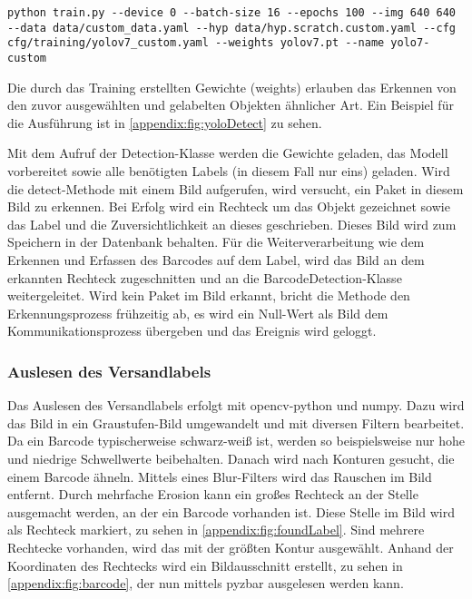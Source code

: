 \begin{lstlisting}[style=bash-style,
  caption={Befehl zum Trainieren des Modells},
  breaklines=true,
  label={lst:runYolov7}]
  python train.py --device 0 --batch-size 16 --epochs 100 --img 640 640 --data data/custom_data.yaml --hyp data/hyp.scratch.custom.yaml --cfg cfg/training/yolov7_custom.yaml --weights yolov7.pt --name yolo7-custom
\end{lstlisting}

Die durch das Training erstellten Gewichte (weights) erlauben das Erkennen von den zuvor ausgewählten und gelabelten Objekten ähnlicher Art. Ein Beispiel für die Ausführung ist in \vref{appendix:fig:yoloDetect} zu sehen.

Mit dem Aufruf der Detection-Klasse werden die Gewichte geladen, das Modell vorbereitet sowie alle benötigten Labels (in diesem Fall nur eins) geladen. Wird die detect-Methode mit einem Bild aufgerufen, wird versucht, ein Paket in diesem Bild zu erkennen. Bei Erfolg wird ein Rechteck um das Objekt gezeichnet sowie das Label und die Zuversichtlichkeit an dieses geschrieben. Dieses Bild wird zum Speichern in der Datenbank behalten. Für die Weiterverarbeitung wie dem Erkennen und Erfassen des Barcodes auf dem Label, wird das Bild an dem erkannten Rechteck zugeschnitten und an die BarcodeDetection-Klasse weitergeleitet. Wird kein Paket im Bild erkannt, bricht die Methode den Erkennungsprozess frühzeitig ab, es wird ein Null-Wert als Bild dem Kommunikationsprozess übergeben und das Ereignis wird geloggt.


\subsubsection{Auslesen des Versandlabels}

Das Auslesen des Versandlabels erfolgt mit opencv-python und numpy. Dazu wird das Bild in ein Graustufen-Bild umgewandelt und mit diversen Filtern bearbeitet. Da ein Barcode typischerweise schwarz-weiß ist, werden so beispielsweise nur hohe und niedrige Schwellwerte beibehalten. Danach wird nach Konturen gesucht, die einem Barcode ähneln. Mittels eines Blur-Filters wird das Rauschen im Bild entfernt. Durch mehrfache Erosion kann ein großes Rechteck an der Stelle ausgemacht werden, an der ein Barcode vorhanden ist. Diese Stelle im Bild wird als Rechteck markiert, zu sehen in \vref{appendix:fig:foundLabel}. Sind mehrere Rechtecke vorhanden, wird das mit der größten Kontur ausgewählt. Anhand der Koordinaten des Rechtecks wird ein Bildausschnitt erstellt, zu sehen in \vref{appendix:fig:barcode}, der nun mittels pyzbar ausgelesen werden kann.


